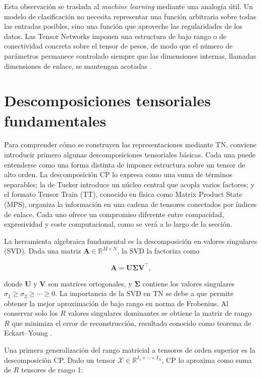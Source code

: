 Esta observación se traslada al \textit{machine learning} mediante una analogía útil. Un modelo de clasificación no necesita representar una función arbitraria sobre todas las entradas posibles, sino una función que aproveche las regularidades de los datos. Las Tensor Networks imponen una estructura de bajo rango o de conectividad concreta sobre el tensor de pesos, de modo que el número de parámetros permanece controlado siempre que las dimensiones internas, llamadas dimensiones de enlace, se mantengan acotadas .

\section{Descomposiciones tensoriales fundamentales}

Para comprender cómo se construyen las representaciones mediante TN, conviene introducir primero algunas descomposiciones tensoriales básicas. Cada una puede entenderse como una forma distinta de imponer estructura sobre un tensor de alto orden. La descomposición CP lo expresa como una suma de términos separables; la de Tucker introduce un núcleo central que acopla varios factores; y el formato Tensor Train (TT), conocido en física como Matrix Product State (MPS), organiza la información en una cadena de tensores conectados por índices de enlace. Cada uno ofrece un compromiso diferente entre compacidad, expresividad y coste computacional, como se verá a lo largo de la sección.

La herramienta algebraica fundamental es la descomposición en valores singulares (SVD). Dada una matriz $\mathbf{A} \in \mathbb{R}^{M \times N}$, la SVD la factoriza como

\begin{equation} \label{eq: svd}
    \mathbf{A} = \mathbf{U} \boldsymbol{\Sigma} \mathbf{V}^\top ,
\end{equation}

donde $\mathbf{U}$ y $\mathbf{V}$ son matrices ortogonales, y $\boldsymbol{\Sigma}$ contiene los valores singulares $\sigma_1 \geq \sigma_2 \geq \cdots \geq 0$. La importancia de la SVD en TN se debe a que permite obtener la mejor aproximación de bajo rango en norma de Frobenius. Al conservar solo los $R$ valores singulares dominantes se obtiene la matriz de rango $R$ que minimiza el error de reconstrucción, resultado conocido como teorema de Eckart--Young .

Una primera generalización del rango matricial a tensores de orden superior es la descomposición CP. Dado un tensor $\boldsymbol{\mathcal{X}} \in \mathbb{R}^{I_1 \times \cdots \times I_N}$, CP lo aproxima como suma de $R$ tensores de rango 1:

